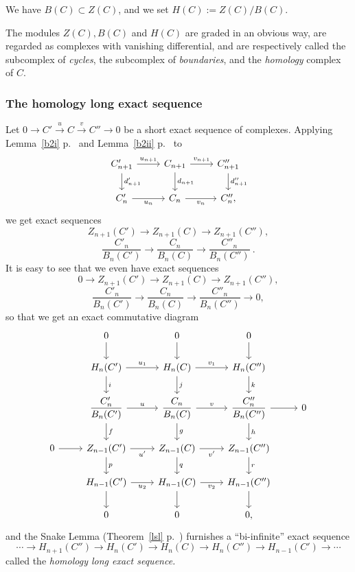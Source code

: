 \documentclass[parskip=half,fontsize=12pt]{scrartcl}%
\newcommand{\ds}{\displaystyle}
\newcommand{\xr}{\xrightarrow}
\begin{document}
We have $B(C)\subset Z(C)$, and we set $H(C):=Z(C)/B(C)$. 

The modules $Z(C),B(C)$ and $H(C)$ are graded in an obvious way, are regarded as complexes with vanishing differential, and are respectively called the subcomplex of \emph{cycles}, the subcomplex of \emph{boundaries}, and the \emph{homology} complex of $C$.



\subsubsection{The homology long exact sequence}\label{hles}%

Let $0\to C'\xr uC\xr vC''\to0$ be a short exact sequence of complexes. Applying Lemma~\ref{b2i} p.~\pageref{b2i} and Lemma~\ref{b2ii} p.~\pageref{b2ii} to %
$$
\begin{tikzcd}
C'_{n+1}\ar[d,"d'_{n+1}"]\ar[r,"u_{n+1}"]&C_{n+1}\ar[d,"d_{n+1}"]\ar[r,"v_{n+1}"]&C''_{n+1}\ar[d,"d''_{n+1}"]\\ 
C'_n\ar[r,"u_n"']&C_n\ar[r,"v_n"']&C''_n,
\end{tikzcd}
$$ 
we get exact sequences 
$$
Z_{n+1}(C')\to Z_{n+1}(C)\to Z_{n+1}(C''),
$$ 
$$
\frac{C'_n}{B_n(C')}\to\frac{C_n}{B_n(C)}\to\frac{C''_n}{B_n(C'')}\ .
$$ 
It is easy to see that we even have exact sequences 
$$
0\to Z_{n+1}(C')\to Z_{n+1}(C)\to Z_{n+1}(C''),
$$ 
$$
\frac{C'_n}{B_n(C')}\to\frac{C_n}{B_n(C)}\to\frac{C''_n}{B_n(C'')}\to0,
$$ 
so that we get an exact commutative diagram 
$$
\begin{tikzcd}
&0\ar{d}&0\ar{d}&0\ar{d}\\ 
&H_n(C')\ar["u_1"]{r}\ar["i"]{d}&H_n(C)\ar["v_1"]{r}\ar["j"]{d}&H_n(C'')\ar["k"]{d}\\ 
&\ds\frac{C'_n}{B_n(C')}\ar["u"]{r}\ar["f"]{d}&\ds\frac{C_n}{B_n(C)}\ar["v"]{r}\ar["g"]{d}&\ds\frac{C''_n}{B_n(C'')}\ar["h"]{d}\ar{r}&0\\ 
0\ar{r}&Z_{n-1}(C')\ar["u'"']{r}\ar["p"]{d}&Z_{n-1}(C)\ar["v'"']{r}\ar["q"]{d}&Z_{n-1}(C'')\ar["r"]{d}\\ 
&H_{n-1}(C')\ar["u_2"']{r}\ar{d}&H_{n-1}(C)\ar["v_2"']{r}\ar{d}&H_{n-1}(C'')\ar{d}\\ 
&0&0&0,
\end{tikzcd}
$$ 
and the Snake Lemma (Theorem~\ref{lsl} p.~\pageref{lsl}) furnishes a ``bi-infinite'' exact sequence 
$$
\cdots\to H_{n+1}(C'')\to H_n(C')\to H_n(C)\to H_n(C'')\to H_{n-1}(C')\to\cdots
$$ 
called the \emph{homology long exact sequence.}
\end{document}
